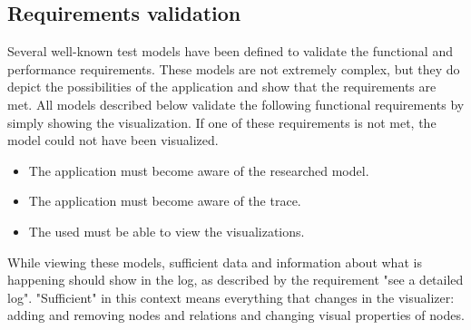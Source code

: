 \documentclass[a4paper]{article}
\begin{document}
	\subsection{Requirements validation}\label{subsec:requirementsvalidation}
	Several well-known test models have been defined to validate the functional and performance requirements. These models are not extremely complex, but they do depict the possibilities of the application and show that the requirements are met. All models described below validate the following functional requirements by simply showing the visualization. If one of these requirements is not met, the model could not have been visualized.
	\begin{itemize}
		\item The application must become aware of the researched model.
		\item The application must become aware of the trace.
		\item The used must be able to view the visualizations.
	\end{itemize}
	While viewing these models, sufficient data and information about what is happening should show in the log, as described by the requirement "see a detailed log". "Sufficient" in this context means everything that changes in the visualizer: adding and removing nodes and relations and changing visual properties of nodes.
	
\end{document}
